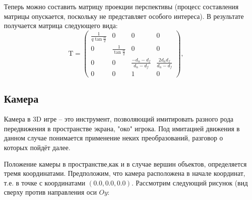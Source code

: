    Теперь можно составить матрицу проекции перспективы (процесс составления матрицы опускается, поскольку не представляет особого интереса).
   В результате получается матрица следующего вида:
\begin{equation}
\mathrm{T} = 
  \begin{pmatrix}
    \frac{1}{q\tan{\frac{\alpha}{2}}} & 0 & 0 & 0 \\
    0 & \frac{1}{\tan{\frac{\alpha}{2}}}  & 0 & 0\\
    0 & 0 & \frac{-d_n - d_f}{d_n - d_f} & \frac{2d_n d_f}{d_n - d_f}\\
    0 & 0 & 1 & 0
  \end{pmatrix},
\end{equation}

\subsection{Камера}
Камера в 3D игре -- это инструмент, позволяющий имитировать разного рода передвижения в пространстве экрана, "око" игрока.
Под имитацией движения в данном случае понимается применение неких преобразований, разговор о которых пойдёт далее.


Положение камеры в пространстве,как и в случае вершин объектов, определяется тремя координатами. Предположим, что камера расположена в начале 
координат, т.е. в точке с координатами \begin{math}(0.0, 0.0, 0.0)\end{math}. Рассмотрим следующий рисунок (вид сверху против направления оси \begin{math}Oy\end{math}:

